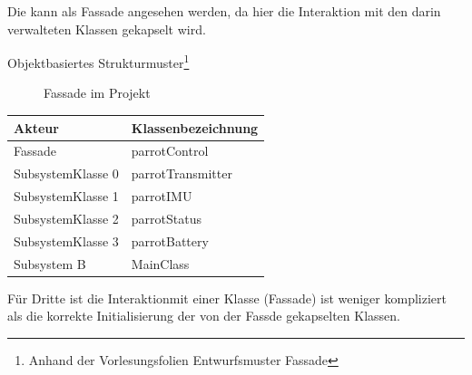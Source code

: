 Die  kann als Fassade angesehen werden, da hier die Interaktion mit den darin verwalteten Klassen gekapselt wird.


Objektbasiertes Strukturmuster\footnote{Anhand der Vorlesungsfolien \glq Entwurfsmuster Fassade\grq}


\begin{figure}[ht!]
\vspace{0.25cm}
\begin{center}
\caption{Fassade im Projekt}
\label{fig:Fas}
\end{center}

\vspace{0.25cm}
\end{figure}

\begin{table}[!ht]
\begin{tabular}{ll}
Akteur			& Klassenbezeichnung \\ \hline
Fassade			& parrotControl\\
SubsystemKlasse 0	& parrotTransmitter\\
SubsystemKlasse 1	& parrotIMU\\
SubsystemKlasse 2	& parrotStatus\\
SubsystemKlasse 3	& parrotBattery\\
Subsystem B		& MainClass
\end{tabular}
\end{table}


\FloatBarrier
{}
Für Dritte ist die Interaktionmit einer Klasse (Fassade) ist weniger kompliziert als die korrekte Initialisierung der von der Fassde gekapselten Klassen.
